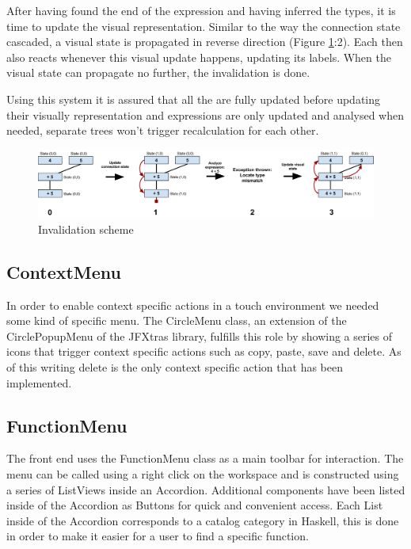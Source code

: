 After having found the end of the expression and having inferred the types, it is time to update the visual representation. Similar to the way the connection state cascaded, a visual state is propagated in reverse direction (Figure \ref{fig:invalidation}:2). Each  then also reacts whenever this visual update happens, updating its labels. When the visual state can propagate no further, the invalidation is done.

Using this system it is assured that all the  are fully updated before updating their visually representation and expressions are only updated and analysed when needed, separate trees won't trigger recalculation for each other.

\begin{figure}[h]
	\centering
	\includegraphics[width=\textwidth]{Images/invalidation}
	\caption{Invalidation scheme}
	\label{fig:invalidation}
\end{figure}

\subsection{ContextMenu}

In order to enable context specific actions in a touch environment we needed some kind of specific menu.
The CircleMenu class, an extension of the CirclePopupMenu of the JFXtras library, fulfills this role by showing a series of icons that trigger context specific actions such as copy, paste, save and delete.
As of this writing delete is the only context specific action that has been implemented.

\subsection{FunctionMenu}

The front end uses the FunctionMenu class as a main toolbar for interaction.
The menu can be called using a right click on the workspace and is constructed using a series of ListViews inside an Accordion.
Additional components have been listed inside of the Accordion as Buttons for quick and convenient access.
Each List inside of the Accordion corresponds to a catalog category in Haskell, this is done in order to make it easier for a user
to find a specific function.

